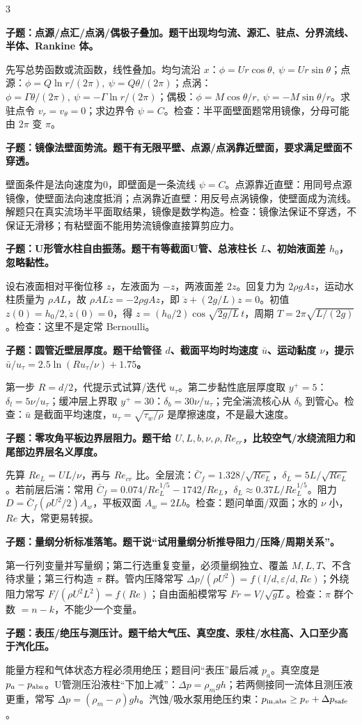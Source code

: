 \documentclass[a4paper]{article}
\newcommand{\qt}[1]{\vspace{0.10pt}\colorbox{Q}{\parbox{\dimexpr\linewidth-2\fboxsep}{\color{white}\bfseries #1}}\par}
\newcommand{\ans}[1]{\colorbox{G}{\parbox{\dimexpr\linewidth-2\fboxsep}{#1}}\par}
\begin{document}
\begin{multicols}{3}
\qt{子题：点源/点汇/点涡/偶极子叠加。题干出现均匀流、源汇、驻点、分界流线、半体、Rankine 体。}
\ans{先写总势函数或流函数，线性叠加。均匀流沿 $x$：$\phi=Ur\cos\theta,\ \psi=Ur\sin\theta$；点源：$\phi=Q\ln r/(2\pi),\ \psi=Q\theta/(2\pi)$；点涡：$\phi=\Gamma\theta/(2\pi),\ \psi=-\Gamma\ln r/(2\pi)$；偶极：$\phi=M\cos\theta/r,\ \psi=-M\sin\theta/r$。求驻点令 $v_r=v_\theta=0$；求边界令 $\psi=C$。检查：半平面壁面题常用镜像，分母可能由 $2\pi$ 变 $\pi$。}
\qt{子题：镜像法壁面势流。题干有无限平壁、点源/点涡靠近壁面，要求满足壁面不穿透。}
\ans{壁面条件是法向速度为0，即壁面是一条流线 $\psi=C$。点源靠近直壁：用同号点源镜像，使壁面法向速度抵消；点涡靠近直壁：用反号点涡镜像，使壁面成为流线。解题只在真实流场半平面取结果，镜像是数学构造。检查：镜像法保证不穿透，不保证无滑移；有粘壁面不能用势流镜像直接算剪应力。}
\qt{子题：U形管水柱自由振荡。题干有等截面U管、总液柱长 $L$、初始液面差 $h_0$，忽略黏性。}
\ans{设右液面相对平衡位移 $z$，左液面为 $-z$，两液面差 $2z$。回复力为 $2\rho gAz$，运动水柱质量为 $\rho AL$，故 $\rho AL\ddot z=-2\rho gAz$，即 $\ddot z+(2g/L)z=0$。初值 $z(0)=h_0/2,\dot z(0)=0$，得 $z=(h_0/2)\cos\sqrt{2g/L}\,t$，周期 $T=2\pi\sqrt{L/(2g)}$。检查：这里不是定常 Bernoulli。}
\qt{子题：圆管近壁层厚度。题干给管径 $d$、截面平均时均速度 $\bar u$、运动黏度 $\nu$，提示 $\bar u/u_\tau=2.5\ln(Ru_\tau/\nu)+1.75$。}
\ans{第一步 $R=d/2$，代提示式试算/迭代 $u_\tau$。第二步黏性底层厚度取 $y^+=5$：$\delta_l=5\nu/u_\tau$；缓冲层上界取 $y^+=30$：$\delta_b=30\nu/u_\tau$；完全湍流核心从 $\delta_b$ 到管心。检查：$\bar u$ 是截面平均速度，$u_\tau=\sqrt{\tau_w/\rho}$ 是摩擦速度，不是最大速度。}
\qt{子题：零攻角平板边界层阻力。题干给 $U,L,b,\nu,\rho,Re_{cr}$，比较空气/水绕流阻力和尾部边界层名义厚度。}
\ans{先算 $Re_L=UL/\nu$，再与 $Re_{cr}$ 比。全层流：$\bar C_f=1.328/\sqrt{Re_L}$，$\delta_L=5L/\sqrt{Re_L}$。若前层后湍：常用 $\bar C_f=0.074/Re_L^{1/5}-1742/Re_L$，$\delta_L\approx0.37L/Re_L^{1/5}$。阻力 $D=\bar C_f(\rho U^2/2)A_w$，平板双面 $A_w=2Lb$。检查：题问单面/双面；水的 $\nu$ 小，$Re$ 大，常更易转捩。}
\qt{子题：量纲分析标准落笔。题干说“试用量纲分析推导阻力/压降/周期关系”。}
\ans{第一行列变量并写量纲；第二行选重复变量，必须量纲独立、覆盖 $M,L,T$、不含待求量；第三行构造 $\pi$ 群。管内压降常写 $\Delta p/(\rho U^2)=f(l/d,\varepsilon/d,Re)$；外绕阻力常写 $F/(\rho U^2L^2)=f(Re)$；自由面船模常写 $Fr=V/\sqrt{gL}$。检查：$\pi$ 群个数 $=n-k$，不能少一个变量。}
\qt{子题：表压/绝压与测压计。题干给大气压、真空度、汞柱/水柱高、入口至少高于汽化压。}
\ans{能量方程和气体状态方程必须用绝压；题目问“表压”最后减 $p_a$。真空度是 $p_a-p_{\rm abs}$。U管测压沿液柱“下加上减”：$\Delta p=\rho_mgh$；若两侧接同一流体且测压液更重，常写 $\Delta p=(\rho_m-\rho)gh$。汽蚀/吸水泵用绝压约束：$p_{\rm in,abs}\ge p_v+\Delta p_{\rm safe}$。}

\end{multicols}
\end{document}
